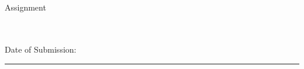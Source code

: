 \newcommand{\courseNumb}{CS203B}
\newcommand{\courseName}{ Mathematics For Computer Science -III (Probability)}\\
\newcommand{\subDate}{}
\newcommand{\assignNumb}{3}

\begin{minipage}[t]{0.50\linewidth}
    \begin{flushleft}
        {\huge \textbf{\courseNumb}}\\
        {\large \courseName}\\
        {\normalsize Indian Institute of Technology, Kanpur}\\
        \rule{0mm}{8mm}%
        {\large \itshape Name:}\\
        {\normalsize \textit{%
    \end{flushleft}
\end{minipage}
\hfill
\begin{minipage}[t]{0.40\linewidth}
    \centering
    {\huge Assignment}\\ \rule{0mm}{15mm} \scalebox{5}{3}\\~\\
        Date of Submission: \\ %

\end{minipage}

\rule{0mm}{0.5mm}%

{\centering \rule{0.99\linewidth}{1pt} }
